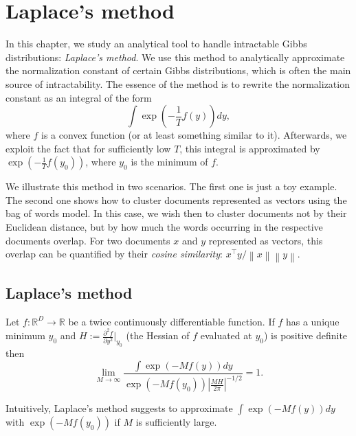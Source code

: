 \chapter{Laplace's method}
\label{ch:laplace}

In this chapter, we study an analytical tool to handle intractable Gibbs distributions: \emph{Laplace's method}. We use this method to analytically approximate the normalization constant of certain Gibbs distributions, which is often the main source of intractability. The essence of the method is to rewrite the normalization constant as an integral of the form
%
\begin{equation}
\int \exp\left(-\frac{1}{T}f(y)\right) dy,
\end{equation}
%
where $f$ is a convex function (or at least something similar to it). Afterwards, we exploit the fact that for sufficiently low $T$, this integral is approximated by $\exp(-\frac{1}{T}f(y_0))$, where $y_0$ is the minimum of $f$.

We illustrate this method in two scenarios. The first one is just a toy example. The second one shows how to cluster documents represented as vectors using the bag of words model. In this case, we wish then to cluster documents not by their Euclidean distance, but by how much the words occurring in the respective documents overlap. For two documents $x$ and $y$ represented as vectors, this overlap can be quantified by their \emph{cosine similarity}: $x^\top y / \left\|x\right\|\left\|y\right\|$.

\newpage
\section{Laplace's method}

\begin{theorem}
Let $f : \mathbb{R}^D \to \mathbb{R}$ be a twice continuously differentiable function. If $f$ has a unique minimum $y_0$ and $H := \frac{\partial^2 f}{\partial y^2} \bigr |_{y_0}$ (the Hessian of $f$ evaluated at $y_0$) is positive definite then
%
\begin{equation}
\lim_{M \to \infty} \frac{\displaystyle \int \exp\left(-M f(y)\right) dy}{\displaystyle \exp\left(-M f(y_0)\right)\left|\frac{MH}{2\pi}\right|^{-1/2}}=1.
\end{equation}
%
\label{thm:laplace}
\end{theorem}

Intuitively, Laplace's method suggests to approximate $\int \exp\left(-M f(y)\right) dy$ with $\exp\left(-M f(y_0)\right)$ if $M$ is sufficiently large.

